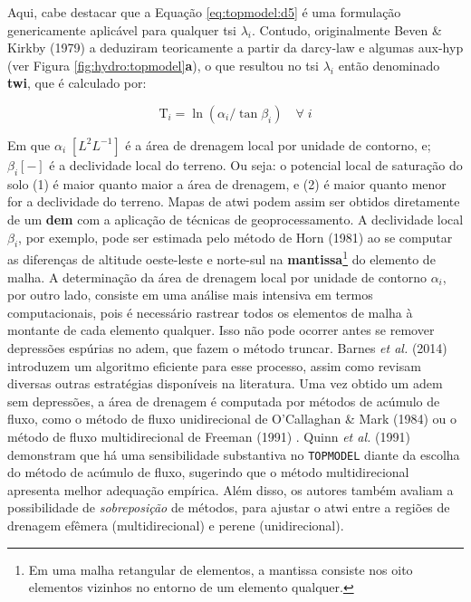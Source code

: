 \documentclass[./main.tex]{subfiles}
\begin{document}
\par Aqui, cabe destacar que a Equação \eqref{eq:topmodel:d5} é uma formulação genericamente aplicável para qualquer \gls{tsi} $\lambda_{i}$. Contudo, originalmente Beven \& Kirkby (1979) a deduziram teoricamente a partir da \gls{darcy-law} e algumas \gls{aux-hyp} (ver Figura \ref{fig:hydro:topmodel}\textbf{a}), o que resultou no \gls{tsi} $\lambda_{i}$ então denominado \textbf{\gls{twi}}, que é calculado por:
\begin{linenomath*}
\begin{equation}
\label{eq:topmodel:twi}
\text{T}_{i}  = \ln{(\alpha_{i}/\tan \beta_{i})} \quad \forall \; i
\end{equation}
\end{linenomath*}
Em que $\alpha_{i}\; [L^{2}L^{-1}]$ é a área de drenagem local por unidade de contorno, e;  $\beta_{i} [-]$ é a declividade local do terreno. Ou seja: o potencial local de saturação do solo (1)  é maior quanto maior a área de drenagem, e (2) é maior quanto menor for a declividade do terreno. Mapas de \acrshort{atwi} podem assim ser obtidos diretamente de um \textbf{\gls{dem}} com a aplicação de técnicas de geoprocessamento. A declividade local $\beta_{i}$, por exemplo, pode ser estimada pelo método de Horn (1981) \cite{Horn1981a} ao se computar as diferenças de altitude oeste-leste e norte-sul na \textbf{mantissa}\footnote{Em uma malha retangular de elementos, a mantissa consiste nos oito elementos vizinhos no entorno de um elemento qualquer.} do elemento de malha. A determinação da área de drenagem local por unidade de contorno $\alpha_{i}$, por outro lado, consiste em uma análise mais intensiva em termos computacionais, pois é necessário rastrear todos os elementos de malha à montante de cada elemento qualquer. Isso não pode ocorrer antes se remover depressões espúrias no \acrshort{adem}, que fazem o método truncar. Barnes \textit{et al.} (2014) \cite{Barnes2014a} introduzem um algoritmo eficiente para esse processo, assim como revisam diversas outras estratégias disponíveis na literatura. Uma vez obtido um \acrshort{adem} sem depressões, a área de drenagem é computada por métodos de acúmulo de fluxo, como o método de fluxo unidirecional de O'Callaghan \& Mark (1984) \cite{Ocallaghan1984a} ou o método de fluxo multidirecional de Freeman (1991) \cite{Freeman1991a}. Quinn \textit{et al.} (1991) \cite{Quinn1991b} demonstram que há uma sensibilidade substantiva no \texttt{TOPMODEL} diante da escolha do método de acúmulo de fluxo, sugerindo que o método multidirecional apresenta melhor adequação empírica. Além disso, os autores também avaliam a possibilidade de \textit{sobreposição} de métodos, para ajustar o \acrshort{atwi} entre a regiões de drenagem efêmera (multidirecional) e perene (unidirecional).
\end{document}
